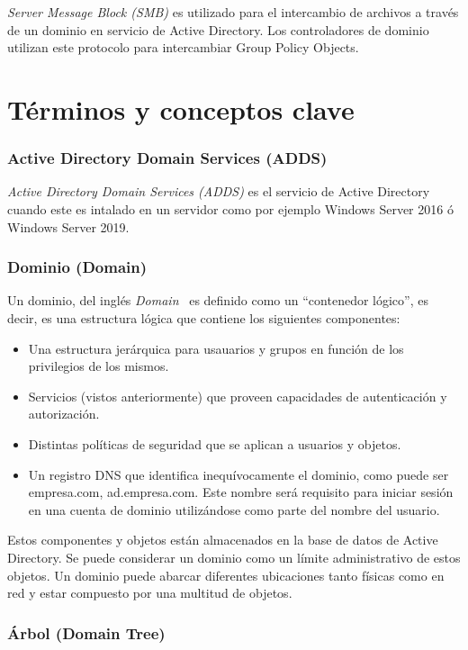 {\it Server Message Block (SMB)} es utilizado para el intercambio de archivos a través de un dominio en servicio de Active Directory. Los controladores de dominio utilizan este protocolo para intercambiar Group Policy Objects. 


\section{Términos y conceptos clave}


\subsubsection{Active Directory Domain Services (ADDS)}

{\it Active Directory Domain Services (ADDS)} es el servicio de Active Directory cuando este es intalado en un servidor como por ejemplo Windows Server 2016 ó Windows Server 2019.

\subsubsection{Dominio (Domain)}

Un dominio, del inglés {\it Domain}~\cite{Capitulo4:Domain} es definido como un ``contenedor lógico'', es decir, es una estructura lógica que contiene los siguientes componentes:

\begin{itemize}
\item Una estructura jerárquica para usauarios y grupos en función de los privilegios de los mismos.
\item Servicios (vistos anteriormente) que proveen capacidades de autenticación y autorización.
\item Distintas políticas de seguridad que se aplican a usuarios y objetos.
\item Un registro DNS que identifica inequívocamente el dominio, como puede ser empresa.com, ad.empresa.com. Este nombre será requisito para iniciar sesión en una cuenta de dominio utilizándose como parte del nombre del usuario. 
\end{itemize}

Estos componentes y objetos están almacenados en la base de datos de Active Directory. Se puede considerar un dominio como un límite administrativo de estos objetos. Un dominio puede abarcar diferentes ubicaciones tanto físicas como en red y estar compuesto por una multitud de objetos.

\subsubsection{Árbol (Domain Tree)}

